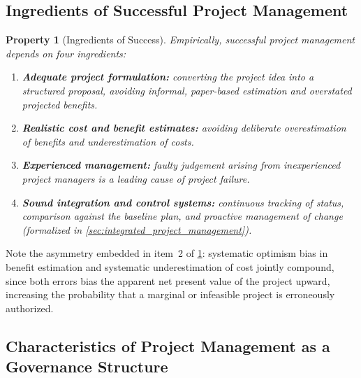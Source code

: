 \documentclass[12pt, a4paper]{report}
\theoremstyle{engnotes}
\newtheorem{property}{Property}[section]
\begin{document}
\subsection{Ingredients of Successful Project Management}
\label{subsec:ingredients_success}

\begin{property}[Ingredients of Success]\label{pty:ingredients_success}
    Empirically, successful project management depends on four ingredients:
    \begin{enumerate}
        \item \textbf{Adequate project formulation:} converting the project idea into a structured proposal, avoiding informal, paper-based estimation and overstated projected benefits.
        \item \textbf{Realistic cost and benefit estimates:} avoiding deliberate overestimation of benefits and underestimation of costs.
        \item \textbf{Experienced management:} faulty judgement arising from inexperienced project managers is a leading cause of project failure.
        \item \textbf{Sound integration and control systems:} continuous tracking of status, comparison against the baseline plan, and proactive management of change (formalized in \cref{sec:integrated_project_management}).
    \end{enumerate}
\end{property}

\begin{note}
    Note the asymmetry embedded in item~2 of \cref{pty:ingredients_success}: systematic optimism bias in benefit estimation and systematic underestimation of cost jointly compound, since both errors bias the apparent net present value of the project upward, increasing the probability that a marginal or infeasible project is erroneously authorized.
\end{note}

\subsection{Characteristics of Project Management as a Governance Structure}
\label{subsec:characteristics_pm_governance}
\end{document}
